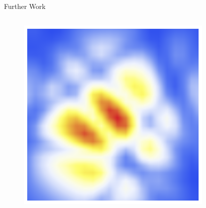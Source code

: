 \documentclass{beamer}
\begin{document}
\begin{frame}{Further Work}
\begin{minipage}[t]{\textwidth}
\begin{columns}[t]
\begin{column}{0.1\textwidth}
\begin{figure}
          \includegraphics[scale=0.1]{images/flows-4.png}
        \end{figure}
      \end{column}
    \end{columns}
    \pause
  \end{minipage}
\end{frame}
\end{document}
